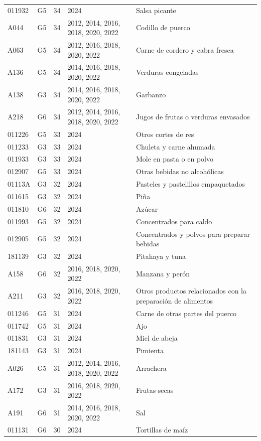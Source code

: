 \begin{table}[ht]
\begin{tabular}{llrll}
  011932 & G5 &  34 & 2024 & Salsa picante \\ 
  A044 & G5 &  34 & 2012, 2014, 2016, 2018, 2020, 2022 & Codillo de puerco \\ 
  A063 & G5 &  34 & 2012, 2016, 2018, 2020, 2022 & Carne de cordero y cabra fresca \\ 
  A136 & G5 &  34 & 2014, 2016, 2018, 2020, 2022 & Verduras congeladas \\ 
  A138 & G3 &  34 & 2014, 2016, 2018, 2020, 2022 & Garbanzo \\ 
  A218 & G6 &  34 & 2012, 2014, 2016, 2018, 2020, 2022 & Jugos de frutas o verduras envasados \\ 
  011226 & G5 &  33 & 2024 & Otros cortes de res \\ 
  011233 & G3 &  33 & 2024 & Chuleta y carne ahumada \\ 
  011933 & G3 &  33 & 2024 & Mole en pasta o en polvo \\ 
  012907 & G5 &  33 & 2024 & Otras bebidas no alcohólicas \\ 
  01113A & G3 &  32 & 2024 & Pasteles y pastelillos empaquetados \\ 
  011615 & G3 &  32 & 2024 & Piña \\ 
  011810 & G6 &  32 & 2024 & Azúcar \\ 
  011993 & G5 &  32 & 2024 & Concentrados para caldo \\ 
  012905 & G5 &  32 & 2024 & Concentrados y polvos para preparar bebidas \\ 
  181139 & G3 &  32 & 2024 & Pitahaya y tuna \\ 
  A158 & G6 &  32 & 2016, 2018, 2020, 2022 & Manzana y perón \\ 
  A211 & G3 &  32 & 2016, 2018, 2020, 2022 & Otros productos relacionados con la preparación de alimentos \\ 
  011246 & G5 &  31 & 2024 & Carne de otras partes del puerco \\ 
  011742 & G5 &  31 & 2024 & Ajo \\ 
  011831 & G3 &  31 & 2024 & Miel de abeja \\ 
  181143 & G3 &  31 & 2024 & Pimienta \\ 
  A026 & G5 &  31 & 2012, 2014, 2016, 2018, 2020, 2022 & Arrachera \\ 
  A172 & G3 &  31 & 2016, 2018, 2020, 2022 & Frutas secas \\ 
  A191 & G6 &  31 & 2014, 2016, 2018, 2020, 2022 & Sal \\ 
  011131 & G6 &  30 & 2024 & Tortillas de maíz \\ 

\end{tabular}
\end{table}
